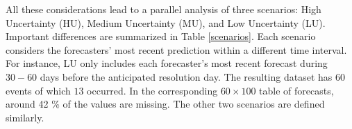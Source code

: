 \documentclass[11pt]{article}
\theoremstyle{definition}
\theoremstyle{definition}
\begin{document}
All these considerations lead to a parallel analysis of three scenarios: High Uncertainty (HU), Medium Uncertainty (MU), and Low Uncertainty (LU). Important differences are summarized in Table \ref{scenarios}. Each scenario considers the forecasters' most recent prediction within a different time interval.  For instance, LU only includes each forecaster's most recent forecast during $30-60$ days before the anticipated resolution day. The resulting dataset has $60$ events of which $13$ occurred. In the corresponding $60 \times 100$ table of forecasts, around 42 \% of the values are missing. The other two scenarios are defined similarly. 



% 
 




\end{document}
